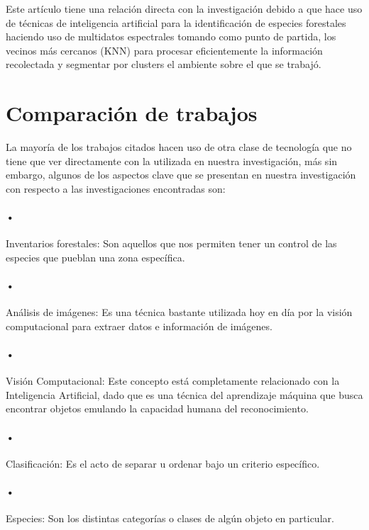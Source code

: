 Este artículo tiene una relación directa con la investigación debido a que hace uso de técnicas de inteligencia artificial para la identificación  de especies forestales haciendo uso de multidatos espectrales tomando como punto de partida, los vecinos más cercanos (KNN) para procesar eficientemente la información recolectada y segmentar por clusters el ambiente sobre el que se trabajó. \cite{rf10}

\pagebreak
 
\section{Comparación de trabajos}
La mayoría de los trabajos citados hacen uso de otra clase de tecnología que no tiene que ver directamente con la utilizada en nuestra investigación, más sin embargo, algunos de los aspectos clave que se presentan en nuestra investigación con respecto a las investigaciones encontradas son:


\paragraph{•} Inventarios forestales: Son aquellos que nos permiten tener un control de las especies que pueblan una zona específica.

\paragraph{•} Análisis de imágenes: Es una técnica bastante utilizada hoy en día por la visión computacional para extraer datos e información de imágenes. 

\paragraph{•} Visión Computacional: Este concepto está completamente relacionado con la Inteligencia Artificial, dado que es una  técnica del aprendizaje máquina que busca encontrar objetos emulando la capacidad humana del reconocimiento.

\paragraph{•} Clasificación: Es el acto de separar u ordenar bajo un criterio específico.

\paragraph{•} Especies: Son los distintas categorías o  clases de algún objeto en particular.
 
